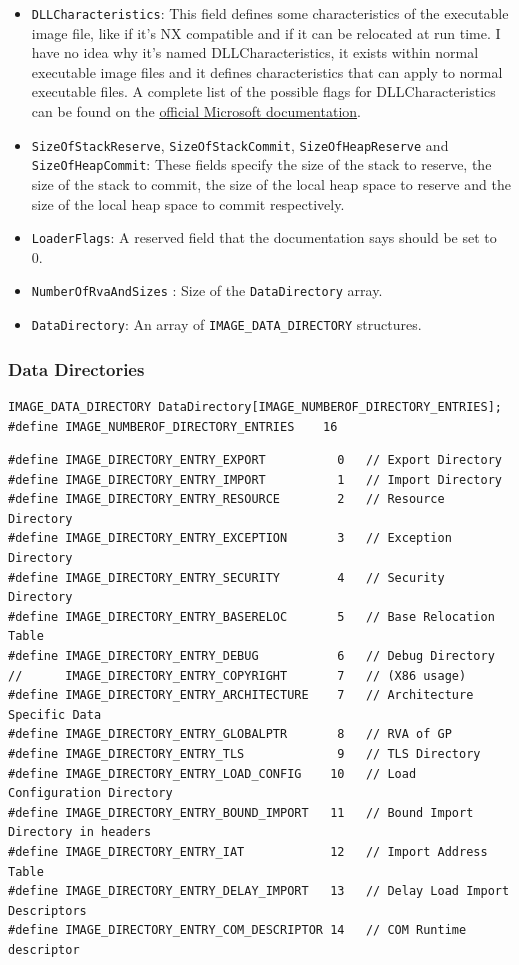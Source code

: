 \begin{itemize}
    \item \verb+DLLCharacteristics+: This field defines some characteristics of the executable image file, like if it’s NX compatible and if it can be relocated at run time. I have no idea why it’s named DLLCharacteristics, it exists within normal executable image files and it defines characteristics that can apply to normal executable files. A complete list of the possible flags for DLLCharacteristics can be found on the \href{https://learn.microsoft.com/en-us/windows/win32/debug/pe-format#windows-subsystem}{official Microsoft documentation}.
    \item \verb+SizeOfStackReserve+, \verb+SizeOfStackCommit+, \verb+SizeOfHeapReserve+ and \verb+SizeOfHeapCommit+: These fields specify the size of the stack to reserve, the size of the stack to commit, the size of the local heap space to reserve and the size of the local heap space to commit respectively.
    \item \verb+LoaderFlags+: A reserved field that the documentation says should be set to 0.
    \item \verb+NumberOfRvaAndSizes+ : Size of the \verb+DataDirectory+ array.
    \item \verb+DataDirectory+: An array of \verb+IMAGE_DATA_DIRECTORY+ structures.
\end{itemize}

\subsubsection{Data Directories}
\begin{verbatim}
IMAGE_DATA_DIRECTORY DataDirectory[IMAGE_NUMBEROF_DIRECTORY_ENTRIES];
#define IMAGE_NUMBEROF_DIRECTORY_ENTRIES    16
\end{verbatim}

\begin{verbatim}
#define IMAGE_DIRECTORY_ENTRY_EXPORT          0   // Export Directory
#define IMAGE_DIRECTORY_ENTRY_IMPORT          1   // Import Directory
#define IMAGE_DIRECTORY_ENTRY_RESOURCE        2   // Resource Directory
#define IMAGE_DIRECTORY_ENTRY_EXCEPTION       3   // Exception Directory
#define IMAGE_DIRECTORY_ENTRY_SECURITY        4   // Security Directory
#define IMAGE_DIRECTORY_ENTRY_BASERELOC       5   // Base Relocation Table
#define IMAGE_DIRECTORY_ENTRY_DEBUG           6   // Debug Directory
//      IMAGE_DIRECTORY_ENTRY_COPYRIGHT       7   // (X86 usage)
#define IMAGE_DIRECTORY_ENTRY_ARCHITECTURE    7   // Architecture Specific Data
#define IMAGE_DIRECTORY_ENTRY_GLOBALPTR       8   // RVA of GP
#define IMAGE_DIRECTORY_ENTRY_TLS             9   // TLS Directory
#define IMAGE_DIRECTORY_ENTRY_LOAD_CONFIG    10   // Load Configuration Directory
#define IMAGE_DIRECTORY_ENTRY_BOUND_IMPORT   11   // Bound Import Directory in headers
#define IMAGE_DIRECTORY_ENTRY_IAT            12   // Import Address Table
#define IMAGE_DIRECTORY_ENTRY_DELAY_IMPORT   13   // Delay Load Import Descriptors
#define IMAGE_DIRECTORY_ENTRY_COM_DESCRIPTOR 14   // COM Runtime descriptor
\end{verbatim}

